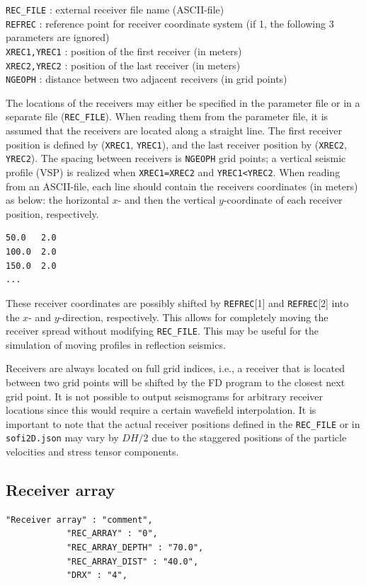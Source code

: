 \texttt{REC\_FILE} : external receiver file name (ASCII-file)\\
\texttt{REFREC} : reference point for receiver coordinate system (if 1, the following 3 parameters are ignored)\\
\texttt{XREC1,YREC1} : position of the first receiver (in meters) \\
\texttt{XREC2,YREC2} : position of the last receiver (in meters)\\
\texttt{NGEOPH} : distance between two adjacent receivers (in grid points)

The locations of the receivers may either be specified in the parameter file or in a separate file (\texttt{REC\_FILE}). When reading them from the parameter file, it is assumed that the receivers are located along a straight line. The first receiver position is defined by (\texttt{XREC1}, \texttt{YREC1}), and the last receiver position by (\texttt{XREC2}, \texttt{YREC2}). The spacing between receivers is \texttt{NGEOPH} grid points; a vertical seismic profile (VSP) is realized when \texttt{XREC1=XREC2} and \texttt{YREC1<YREC2}. When reading from an ASCII-file, each line should contain the receivers coordinates (in meters) as below: the horizontal $x$- and then the vertical $y$-coordinate of each receiver position, respectively.
\begin{verbatim}
50.0   2.0
100.0  2.0
150.0  2.0
...
\end{verbatim}

These receiver coordinates are possibly shifted by \texttt{REFREC}[1] and \texttt{REFREC}[2] into the $x$- and $y$-direction, respectively. This allows for completely moving the receiver spread without modifying \texttt{REC\_FILE}. This may be useful for the simulation of moving profiles in reflection seismics.

Receivers are always located on full grid indices, i.e., a receiver that is located between two grid points will be shifted by the FD program to the closest next grid point. It is not possible to output seismograms for arbitrary receiver locations since this would require a certain wavefield interpolation. It is important to note that the actual receiver positions defined in the \texttt{REC\_FILE} or in \texttt{sofi2D.json} may vary by $DH/2$ due to the staggered positions of the particle velocities and stress tensor components.

\subsection{Receiver array}
\begin{verbatim}
"Receiver array" : "comment",
            "REC_ARRAY" : "0",
            "REC_ARRAY_DEPTH" : "70.0",
            "REC_ARRAY_DIST" : "40.0", 
            "DRX" : "4",
\end{verbatim}

